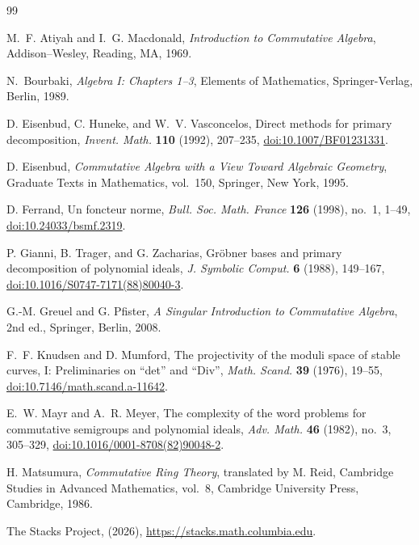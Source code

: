 \documentclass[11pt,leqno]{amsart}
\theoremstyle{definition}
\numberwithin{equation}{section}
\begin{document}
\begin{thebibliography}{99}

M.~F. Atiyah and I.~G. Macdonald,
\emph{Introduction to Commutative Algebra},
Addison--Wesley, Reading, MA, 1969.

N.~Bourbaki,
\emph{Algebra I: Chapters 1--3},
Elements of Mathematics,
Springer-Verlag, Berlin, 1989.

D. Eisenbud, C. Huneke, and W.~V. Vasconcelos,
Direct methods for primary decomposition,
\emph{Invent. Math.} \textbf{110} (1992), 207--235,
\href{https://doi.org/10.1007/BF01231331}{doi:10.1007/BF01231331}.

D. Eisenbud,
\emph{Commutative Algebra with a View Toward Algebraic Geometry},
Graduate Texts in Mathematics, vol.~150, Springer, New York, 1995.

D. Ferrand,
Un foncteur norme,
\emph{Bull. Soc. Math. France} \textbf{126} (1998), no.~1, 1--49,
\href{https://doi.org/10.24033/bsmf.2319}{doi:10.24033/bsmf.2319}.

P. Gianni, B. Trager, and G. Zacharias,
Gr\"obner bases and primary decomposition of polynomial ideals,
\emph{J. Symbolic Comput.} \textbf{6} (1988), 149--167,
\href{https://doi.org/10.1016/S0747-7171(88)80040-3}{doi:10.1016/S0747-7171(88)80040-3}.

G.-M. Greuel and G. Pfister,
\emph{A Singular Introduction to Commutative Algebra},
2nd ed., Springer, Berlin, 2008.

F.~F. Knudsen and D. Mumford,
The projectivity of the moduli space of stable curves, I: Preliminaries on ``det'' and ``Div'',
\emph{Math. Scand.} \textbf{39} (1976), 19--55,
\href{https://doi.org/10.7146/math.scand.a-11642}{doi:10.7146/math.scand.a-11642}.

E.~W. Mayr and A.~R. Meyer,
The complexity of the word problems for commutative semigroups and polynomial ideals,
\emph{Adv. Math.} \textbf{46} (1982), no.~3, 305--329,
\href{https://doi.org/10.1016/0001-8708(82)90048-2}{doi:10.1016/0001-8708(82)90048-2}.

H. Matsumura,
\emph{Commutative Ring Theory},
translated by M. Reid, Cambridge Studies in Advanced Mathematics, vol.~8,
Cambridge University Press, Cambridge, 1986.

The Stacks Project, (2026), \url{https://stacks.math.columbia.edu}.
\end{thebibliography}
\end{document}
